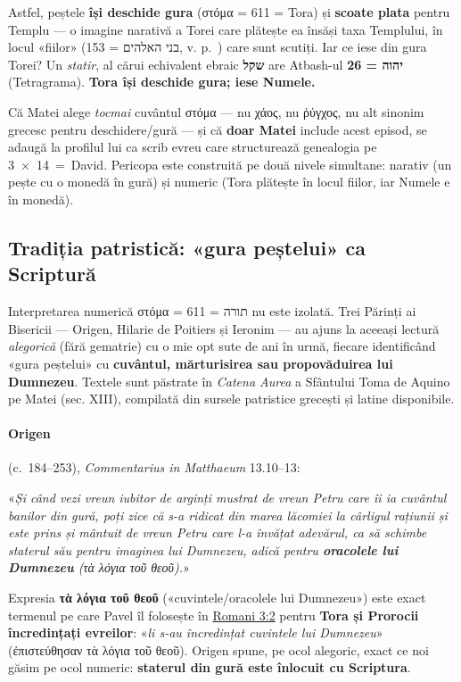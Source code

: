 \documentclass[12pt,a4paper,twoside,openany]{book}
\begin{document}
Astfel, peștele \textbf{își deschide gura} (στόμα = 611 = Tora) și \textbf{scoate plata} pentru Templu --- o imagine narativă a Torei care plătește ea însăși taxa Templului, în locul «fiilor» (בני האלהים = 153, v. p.~\pageref{semnatura}) care sunt scutiți. Iar ce iese din gura Torei? Un \textit{statir}, al cărui echivalent ebraic \textbf{שקל} are Atbash-ul \textbf{26 = יהוה} (Tetragrama). \textbf{Tora își deschide gura; iese Numele.}

Că Matei alege \textit{tocmai} cuvântul στόμα --- nu χάος, nu ῥύγχος, nu alt sinonim grecesc pentru deschidere/gură --- și că \textbf{doar Matei} include acest episod, se adaugă la profilul lui ca scrib evreu care structurează genealogia pe 3~×~14~=~David. Pericopa este construită pe două nivele simultane: narativ (un pește cu o monedă în gură) și numeric (Tora plătește în locul fiilor, iar Numele e în monedă).

\subsection*{Tradiția patristică: «gura peștelui» ca Scriptură}\label{pestele-patristic}

Interpretarea numerică στόμα = 611 = תורה nu este izolată. Trei Părinți ai Bisericii --- Origen, Hilarie de Poitiers și Ieronim --- au ajuns la aceeași lectură \textit{alegorică} (fără gematrie) cu o mie opt sute de ani în urmă, fiecare identificând «gura peștelui» cu \textbf{cuvântul, mărturisirea sau propovăduirea lui Dumnezeu}. Textele sunt păstrate în \textit{Catena Aurea} a Sfântului Toma de Aquino pe Matei (sec. XIII), compilată din sursele patristice grecești și latine disponibile.

\paragraph*{Origen} (c.~184--253), \textit{Commentarius in Matthaeum} 13.10--13:
\begin{biblequote}
«\textit{Și când vezi vreun iubitor de arginți mustrat de vreun Petru care îi ia cuvântul banilor din gură, poți zice că s-a ridicat din marea lăcomiei la cârligul rațiunii și este prins și mântuit de vreun Petru care l-a învățat adevărul, ca să schimbe staterul său pentru imaginea lui Dumnezeu, adică pentru \textbf{oracolele lui Dumnezeu} (τὰ λόγια τοῦ θεοῦ).}»
\end{biblequote}

Expresia \textbf{τὰ λόγια τοῦ θεοῦ} («cuvintele/oracolele lui Dumnezeu») este exact termenul pe care Pavel îl folosește în \href{https://bibliaortodoxa.ro/carte.php?id=52\&cap=3\#2}{Romani 3:2} pentru \textbf{Tora și Prorocii încredințați evreilor}: «\textit{li s-au încredințat cuvintele lui Dumnezeu}» (ἐπιστεύθησαν τὰ λόγια τοῦ θεοῦ). Origen spune, pe ocol alegoric, exact ce noi găsim pe ocol numeric: \textbf{staterul din gură este înlocuit cu Scriptura}.
\end{document}
